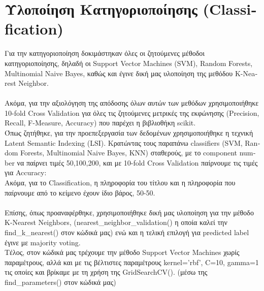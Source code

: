 \documentclass{article}
\begin{document}
\section{Υλοποίηση Κατηγοριοποίησης \textlatin{(Classification)}}
Για την κατηγοριοποίηση δοκιμάστηκαν όλες οι ζητούμενες μέθοδοι κατηγοριοποίησης, δηλαδή οι 
\textlatin{Support Vector Machines (SVM), Random Forests, Multinomial Naive Bayes}, καθώς και 
έγινε δική μας υλοποίηση της μεθόδου \textlatin{K-Nearest Neighbor}.\\\\
Ακόμα, για την αξιολόγηση της απόδοσης όλων αυτών των μεθόδων χρησιμοποιήθηκε
\textlatin{10-fold Cross Validation} για όλες τις ζητούμενες μετρικές της εκφώνησης
\textlatin{(Precision, Recall, F-Measure, Accuracy)} που παρέχει η βιβλιοθήκη \textlatin{scikit}.\\
Όπως ζητήθηκε, για την προεπεξεργασία των δεδομένων χρησιμοποιήθηκε η τεχνική 
\textlatin{Latent Semantic Indexing (LSI)}. Κρατώντας τους παραπάνω \textlatin{classifiers} 
(\textlatin{SVM, Random Forests, Multinomial Naive Bayes, KNN}) σταθερούς, με το 
\textlatin{component number} να παίρνει τιμές 50,100,200, και με \textlatin{10-fold Cross Validation}
παίρνουμε τις τιμές για \textlatin{Accuracy}:\\




Ακόμα, για το \textlatin{Classification}, η πληροφορία του τίτλου και η πληροφορία που παίρνουμε από το κείμενο
έχουν ίδιο βάρος, 50-50.\\\\

Επίσης, όπως προαναφέρθηκε, χρησιμοποιήθηκε δική μας υλοποίηση για την μέθοδο \textlatin{K-Nearest Neighbors},
\textlatin{(nearest\_neighbor\_validation()} η οποία καλεί την\\ \textlatin{find\_k\_nearest()} στον κώδικά μας)
ενώ και η τελική επιλογή για \textlatin{predicted label} έγινε με \textlatin{majority voting}.\\

Τέλος, στον κώδικά μας τρέχουμε την μέθοδο \textlatin{Support Vector Machines} χωρίς παραμέτρους, αλλά
και με τις βέλτιστες παραμέτρους \textlatin{kernel='rbf', C=10, gamma=1} τις οποίες και βρίκαμε με τη χρήση
της \textlatin{GridSearchCV()}. (μέσω της \textlatin{find\_parameters()} στον κώδικά μας) 
\end{document}
